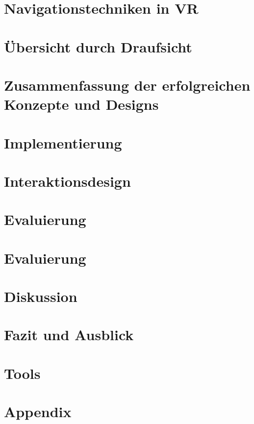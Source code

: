 \documentclass[fontsize=12pt, paper=a4, headinclude, twoside=false, parskip=half+, pagesize=auto, numbers=noenddot, plainheadsepline, open=right, toc=listof]{scrreprt}
\theoremstyle{hypothesisstyle}
\theoremstyle{shypothesisstyle}
\begin{document}
\chapter{Navigationstechniken in VR}


\chapter{Übersicht durch Draufsicht}


\chapter{Zusammenfassung der erfolgreichen Konzepte und Designs}



\chapter{Implementierung}


\chapter{Interaktionsdesign}


\chapter{Evaluierung}


\chapter{Evaluierung}


\chapter{Diskussion}



\chapter{Fazit und Ausblick}


\chapter{Tools}




{\footnotesize
{}

}


\appendix
\chapter{Appendix}

\end{document}
